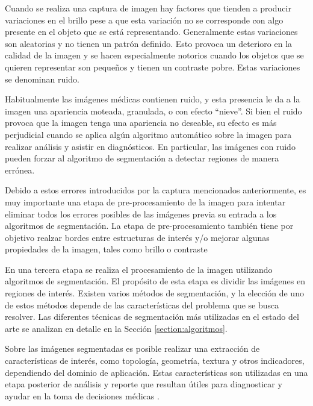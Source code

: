 Cuando se realiza una captura de imagen hay factores que tienden a producir variaciones en el brillo pese a que esta variación no se corresponde con algo presente en el objeto que se está representando. Generalmente estas variaciones son aleatorias y no tienen un patrón definido. Esto provoca un deterioro en la calidad de la imagen y se hacen especialmente notorios cuando los objetos que se quieren representar son pequeños y tienen un contraste pobre. Estas variaciones se denominan ruido.

Habitualmente las imágenes médicas contienen ruido, y esta presencia le da a la imagen una apariencia moteada, granulada, o con efecto “nieve”. Si bien el ruido provoca que la imagen tenga una apariencia no deseable, su efecto es más perjudicial cuando se aplica algún algoritmo automático sobre la imagen para realizar análisis y asistir en diagnósticos. En particular, las imágenes con ruido pueden forzar al algoritmo de segmentación a detectar regiones de manera errónea.

Debido a estos errores introducidos por la captura mencionados anteriormente, es muy importante una etapa de pre-procesamiento de la imagen para intentar eliminar todos los errores posibles de las imágenes previa su entrada a los algoritmos de segmentación. La etapa de pre-procesamiento también tiene por objetivo realzar bordes entre estructuras de interés y/o mejorar algunas propiedades de la imagen, tales como brillo o contraste \citep{bankman2008handbook}

En una tercera etapa se realiza el procesamiento de la imagen utilizando algoritmos de segmentación. El propósito de esta etapa es dividir las imágenes en regiones de interés. Existen varios métodos de segmentación, y la elección de uno de estos métodos depende de las características del problema que se busca resolver. Las diferentes técnicas de segmentación más utilizadas en el estado del arte se analizan en detalle en la Sección \ref{section:algoritmos}.

Sobre las imágenes segmentadas es posible realizar una extracción de características de interés, como topología, geometría, textura y otros indicadores, dependiendo del dominio de aplicación. Estas características son utilizadas en una etapa posterior de análisis y reporte que resultan útiles para diagnosticar y ayudar en la toma de decisiones médicas \citep{pham2000current}.

